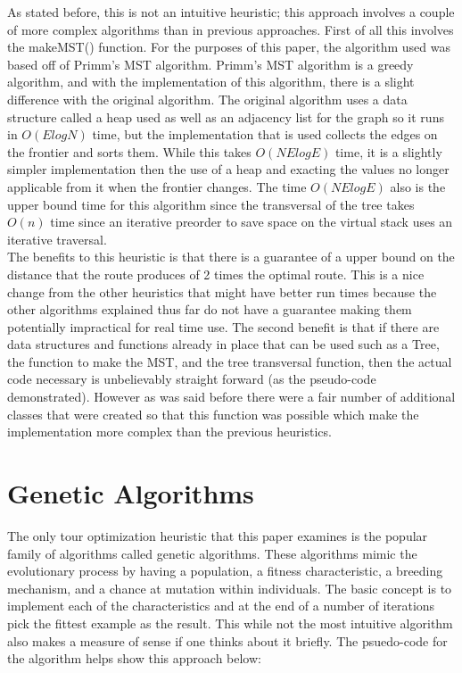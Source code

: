 \documentclass[midd]{thesis}
\newcommand{\tab}{\hspace*{2em}}
\begin{document}
\tab As stated before, this is not an intuitive heuristic; this approach involves a couple of more complex algorithms than in previous approaches. First of all this involves the makeMST() function. For the purposes of this paper, the algorithm used was based off of Primm's MST algorithm. Primm's MST algorithm is a greedy algorithm, and with the implementation of this algorithm, there is a slight difference with the original algorithm. The original algorithm uses a data structure called a heap used as well as an adjacency list for the graph so it runs in $O(ElogN)$ time, but the implementation that is used collects the edges on the frontier and sorts them. While this takes $O(NElogE)$ time, it is a slightly simpler implementation then the use of a heap and exacting the values no longer applicable from it when the frontier changes. The time $O(NElogE)$ also is the upper bound time for this algorithm since the transversal of the tree takes $O(n)$ time since an iterative preorder to save space on the virtual stack uses an iterative traversal.\\
\tab The benefits to this heuristic is that there is a guarantee of a upper bound on the distance that the route produces of 2 times the optimal route. This is a nice change from the other heuristics that might have better run times because the other algorithms explained thus far do not have a guarantee making them potentially impractical for real time use. The second benefit is that if there are data structures and functions already in place that can be used such as a Tree, the function to make the MST, and the tree transversal function, then the actual code necessary is unbelievably straight forward (as the pseudo-code demonstrated). However as was said before there were a fair number of additional classes that were created so that this function was possible which make the implementation more complex than the previous heuristics.

\section{Genetic Algorithms}
\tab The only tour optimization heuristic that this paper examines is the popular family of algorithms called genetic algorithms. These algorithms mimic the evolutionary process by having a population, a fitness characteristic, a breeding mechanism, and a chance at mutation within individuals. The basic concept is to implement each of the characteristics and at the end of a number of iterations pick the fittest example as the result. This while not the most intuitive algorithm also makes a measure of sense if one thinks about it briefly. The psuedo-code for the algorithm helps show this approach below:\\
\end{document}
